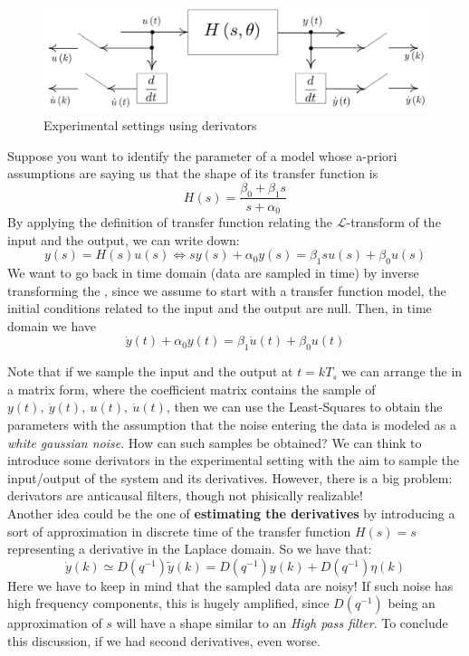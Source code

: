 \begin{figure}[h]
    \centering
    \includegraphics[scale=0.22]{img/derivators.jpg}
    \caption{Experimental settings using derivators}
\end{figure}
Suppose you want to identify the parameter of a model whose a-priori assumptions are saying us that the shape of its transfer function is 
\begin{equation}
    H(s)=\frac{\beta_0+\beta_1{s}}{s+\alpha_0}
\end{equation}
By applying the definition of transfer function relating the $\mathcal{L}$-transform of the input and the output, we can write down: 
\begin{equation}\label{eq:ex_laplace}
    y(s)=H(s)u(s) \iff 
    sy(s)+\alpha_0{y(s)}=\beta_1{s u(s)} + \beta_0 u(s)
\end{equation}
We want to go back in time domain (data are sampled in time) by inverse transforming the , since we assume to start with a transfer function model, the initial conditions related to the input and the output are null. Then, in time domain we have 
\begin{equation}\label{eq:ex_time}
    \dot{y}(t)+\alpha_0{y(t)}=\beta_1\dot{u}(t)+\beta_0{u(t)}
\end{equation}

Note that if we sample the input and the output at $t=kT_s$ we can arrange the  in a matrix form, where the coefficient matrix contains the sample of $y(t), \ \dot{y}(t), \ u(t), \ \dot{u}(t)$, then we can use the Least-Squares to obtain the parameters with the assumption that the noise entering the data is modeled as a \textit{white gaussian noise}.
How can such samples be obtained? We can think to introduce some derivators in the experimental setting with the aim to sample the input/output of the system and its derivatives. However, there is a big problem: derivators are anticausal filters, though not phisically realizable!\\
Another idea could be the one of \textbf{estimating the derivatives} by introducing a sort of approximation in discrete time of the transfer function $H(s)=s$ representing a derivative in the Laplace domain. So we have that:
\begin{equation*}
    \dot{y}(k)\simeq D(q^{-1}) \tilde{y}(k) = D(q^{-1}) y(k) + D(q^{-1}) \eta(k)
\end{equation*}
Here we have to keep in mind that the sampled data are noisy! If such noise has high frequency components, this is hugely amplified, since $D{(q^{-1})}$ being an approximation of $s$ will have a shape similar to an \textit{High pass filter}. To conclude this discussion, if we had second derivatives, even worse. \\

